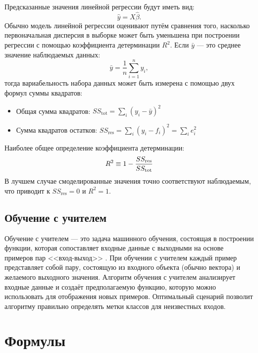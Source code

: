 Предсказанные значения линейной регрессии будут иметь вид:
\begin{equation}
\label{eq:ols_y}
\hat{y} = X{\hat{\beta}}.
\end{equation}
Обычно модель линейной регрессии оценивают путём сравнения того, насколько первоначальная дисперсия в выборке может быть уменьшена при построении регрессии с помощью коэффициента детерминации $R^2$. Если $\bar{y}$ --- это среднее значение наблюдаемых данных:
\begin{equation}
\label{eq:ols_mean}
\bar{y} = {\frac{1}{n}} \sum_{i = 1}^{n} y_{i},
\end{equation}
тогда вариабельность набора данных может быть измерена с помощью двух формул суммы квадратов:
\begin{itemize}
	\item Общая сумма квадратов: $SS_{\text{tot}} = \sum_{i} (y_{i} - {\bar{y}})^{2}$
	\item Сумма квадратов остатков: $SS_{\text{res}} = \sum_{i} (y_{i}-f_{i})^{2} = \sum_{i} e_{i}^{2}$
\end{itemize}
Наиболее общее определение коэффициента детерминации:
\begin{equation}
\label{eq:ols_r2}
R^{2} \equiv 1- {SS_{\text{res}} \over SS_{\text{tot}}}
\end{equation}
В лучшем случае смоделированные значения точно соответствуют наблюдаемым, что приводит к $SS_{\text{res}} = 0$ и $R^{2} = 1$. 

\subsection{Обучение с учителем}\label{subsec:ch1/sec2/subsec2}

Обучение с учителем --- это задача машинного обучения, состоящая в построении функции, которая сопоставляет входные данные с выходными на основе примеров пар <<вход-выход>> \autocite{russell2010artificial}. При обучении с учителем каждый пример представляет собой пару, состоящую из входного объекта (обычно вектора) и желаемого выходного значения. Алгоритм обучения с учителем анализирует входные данные и создаёт предполагаемую функцию, которую можно использовать для отображения новых примеров. Оптимальный сценарий позволит алгоритму правильно определять метки классов для неизвестных входов. 






\section{Формулы}\label{sec:ch1/sec3}

